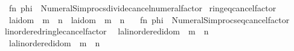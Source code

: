 \begin{isabellebody}
\ \ {\isacartoucheopen}fn\ phi\ {\isacharequal}{\kern0pt}{\isachargreater}{\kern0pt}\ Numeral{\isacharunderscore}{\kern0pt}Simprocs{\isachardot}{\kern0pt}divide{\isacharunderscore}{\kern0pt}cancel{\isacharunderscore}{\kern0pt}numeral{\isacharunderscore}{\kern0pt}factor{\isacartoucheclose}\isanewline
\isanewline
{}\isamarkupfalse%
\ ring{\isacharunderscore}{\kern0pt}eq{\isacharunderscore}{\kern0pt}cancel{\isacharunderscore}{\kern0pt}factor\isanewline
\ \ {\isacharparenleft}{\kern0pt}{\isachardoublequoteopen}{\isacharparenleft}{\kern0pt}l{\isacharcolon}{\kern0pt}{\isacharcolon}{\kern0pt}{\isacharprime}{\kern0pt}a{\isacharcolon}{\kern0pt}{\isacharcolon}{\kern0pt}idom{\isacharparenright}{\kern0pt}\ {\isacharasterisk}{\kern0pt}\ m\ {\isacharequal}{\kern0pt}\ n{\isachardoublequoteclose}\ {\isacharbar}{\kern0pt}\ {\isachardoublequoteopen}{\isacharparenleft}{\kern0pt}l{\isacharcolon}{\kern0pt}{\isacharcolon}{\kern0pt}{\isacharprime}{\kern0pt}a{\isacharcolon}{\kern0pt}{\isacharcolon}{\kern0pt}idom{\isacharparenright}{\kern0pt}\ {\isacharequal}{\kern0pt}\ m\ {\isacharasterisk}{\kern0pt}\ n{\isachardoublequoteclose}{\isacharparenright}{\kern0pt}\ {\isacharequal}{\kern0pt}\isanewline
\ \ {\isacartoucheopen}fn\ phi\ {\isacharequal}{\kern0pt}{\isachargreater}{\kern0pt}\ Numeral{\isacharunderscore}{\kern0pt}Simprocs{\isachardot}{\kern0pt}eq{\isacharunderscore}{\kern0pt}cancel{\isacharunderscore}{\kern0pt}factor{\isacartoucheclose}\isanewline
\isanewline
{}\isamarkupfalse%
\ linordered{\isacharunderscore}{\kern0pt}ring{\isacharunderscore}{\kern0pt}le{\isacharunderscore}{\kern0pt}cancel{\isacharunderscore}{\kern0pt}factor\isanewline
\ \ {\isacharparenleft}{\kern0pt}{\isachardoublequoteopen}{\isacharparenleft}{\kern0pt}l{\isacharcolon}{\kern0pt}{\isacharcolon}{\kern0pt}{\isacharprime}{\kern0pt}a{\isacharcolon}{\kern0pt}{\isacharcolon}{\kern0pt}linordered{\isacharunderscore}{\kern0pt}idom{\isacharparenright}{\kern0pt}\ {\isacharasterisk}{\kern0pt}\ m\ {\isacharless}{\kern0pt}{\isacharequal}{\kern0pt}\ n{\isachardoublequoteclose}\isanewline
\ \ {\isacharbar}{\kern0pt}{\isachardoublequoteopen}{\isacharparenleft}{\kern0pt}l{\isacharcolon}{\kern0pt}{\isacharcolon}{\kern0pt}{\isacharprime}{\kern0pt}a{\isacharcolon}{\kern0pt}{\isacharcolon}{\kern0pt}linordered{\isacharunderscore}{\kern0pt}idom{\isacharparenright}{\kern0pt}\ {\isacharless}{\kern0pt}{\isacharequal}{\kern0pt}\ m\ {\isacharasterisk}{\kern0pt}\ n{\isachardoublequoteclose}{\isacharparenright}{\kern0pt}\ {\isacharequal}{\kern0pt}\isanewline

\end{isabellebody}
